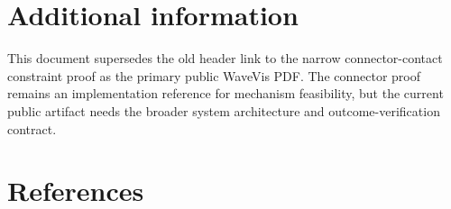 \documentclass[12pt,letterpaper]{article}
\begin{document}
\section{Additional information}

This document supersedes the old header link to the narrow connector-contact constraint proof as the primary public WaveVis PDF. The connector proof remains an implementation reference for mechanism feasibility, but the current public artifact needs the broader system architecture and outcome-verification contract.

\section{References}

\printbibliography[heading=none]
\end{document}
